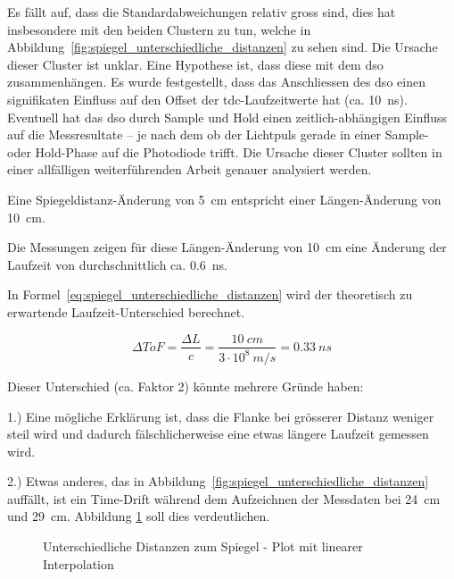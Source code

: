 Es fällt auf, dass die Standardabweichungen relativ gross sind, dies hat insbesondere mit den beiden Clustern zu tun,
welche in Abbildung~\ref{fig:spiegel_unterschiedliche_distanzen} zu sehen sind. Die Ursache dieser Cluster ist unklar.
Eine Hypothese ist, dass diese mit dem \acrshort{dso} zusammenhängen. Es wurde festgestellt, dass das Anschliessen des
\acrshort{dso} einen signifikaten Einfluss auf den Offset der \acrshort{tdc}-Laufzeitwerte hat (ca. 10~ns). Eventuell
hat das \acrshort{dso} durch Sample und Hold einen zeitlich-abhängigen Einfluss auf die Messresultate -- je nach dem ob
der Lichtpuls gerade in einer Sample- oder Hold-Phase auf die Photodiode trifft. Die Ursache dieser Cluster sollten in
einer allfälligen weiterführenden Arbeit genauer analysiert werden.

Eine Spiegeldistanz-Änderung von 5~cm entspricht einer Längen-Änderung von 10~cm.

Die Messungen zeigen für diese Längen-Änderung von 10~cm eine Änderung der Laufzeit von durchschnittlich ca. 0.6~ns.

In Formel~\ref{eq:spiegel_unterschiedliche_distanzen} wird der theoretisch zu erwartende Laufzeit-Unterschied berechnet.

\begin{equation}\label{eq:spiegel_unterschiedliche_distanzen}
    \Delta ToF = \frac{\Delta L}{c} = \frac{10~cm}{3 \cdot 10^8~m/s} = 0.33~ns
\end{equation}

Dieser Unterschied (ca. Faktor 2) könnte mehrere Gründe haben:

1.) Eine mögliche Erklärung ist, dass die Flanke bei grösserer Distanz weniger steil wird und dadurch fälschlicherweise
eine etwas längere Laufzeit gemessen wird.

2.) Etwas anderes, das in Abbildung~\ref{fig:spiegel_unterschiedliche_distanzen} auffällt, ist ein Time-Drift während
dem Aufzeichnen der Messdaten bei 24~cm und 29~cm. Abbildung \ref{fig:spiegel_unterschiedliche_distanzen_linear} soll
dies verdeutlichen.

\begin{figure}[H]
    \centering
    
    \caption{Unterschiedliche Distanzen zum Spiegel - Plot mit linearer Interpolation}\label{fig:spiegel_unterschiedliche_distanzen_linear}
\end{figure}


